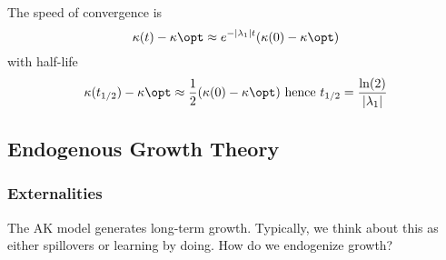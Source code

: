 \documentclass[10pt]{article}
\begin{document}
\begin{model}
	The speed of convergence is \[\kappa(t) - \kappa\opt \approx e^{-|\lambda_1|t}(\kappa(0) - \kappa\opt)\]with half-life\[\kappa(t_{1/2})-\kappa\opt \approx \frac{1}{2} (\kappa(0) - \kappa\opt) \text{ hence } t_{1/2} = \frac{\ln(2)}{|\lambda_1|}\]
\end{model}


\subsection{Endogenous Growth Theory}

\subsubsection{Externalities}

The AK model generates long-term growth. Typically, we think about this as either spillovers or learning by doing. How do we endogenize growth?
\end{document}
